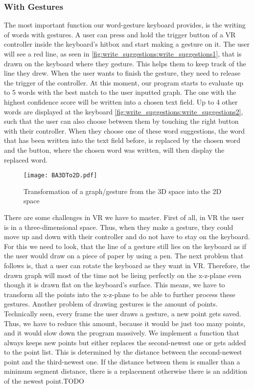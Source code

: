 \subsubsection{With Gestures}
The most important function our word-gesture keyboard provides, is the writing of words with gestures. A user can press and hold the trigger button of a VR controller inside the keyboard's hitbox and start making a gesture on it. The user will see a red line, as seen in \cref{fig:write_suggestions:write_suggestions1}, that is drawn on the keyboard where they gesture. This helps them to keep track of the line they drew. When the user wants to finish the gesture, they need to release the trigger of the controller. At this moment, our program starts to evaluate up to 5 words with the best match to the user inputted graph. The one with the highest confidence score will be written into a chosen text field. Up to 4 other words are displayed at the keyboard \cref{fig:write_suggestions:write_suggestions2}, such that the user can also choose between them by touching the right button with their controller. When they choose one of these word suggestions, the word that has been written into the text field before, is replaced by the chosen word and the button, where the chosen word was written, will then display the replaced word.\\
\begin{figure}[H]
    \centering
    \texttt{[image: BA3DTo2D.pdf]}
    \caption{Transformation of a graph/gesture from the 3D space into the 2D space}
    \label{fig:3DTo2D}
    \end{figure}
There are some challenges in VR we have to master. First of all, in VR the user is in a three-dimensional space. Thus, when they make a gesture, they could move up and down with their controller and do not have to stay on the keyboard. For this we need to look, that the line of a gesture still lies on the keyboard as if the user would draw on a piece of paper by using a pen. The next problem that follows is, that a user can rotate the keyboard as they want in VR. Therefore, the drawn graph will most of the time not be lieing perfectly on the x-z-plane even though it is drawn flat on the keyboard's surface. This means, we have to transform all the points into the x-z-plane to be able to further process these gestures. Another problem of drawing gestures is the amount of points. Technically seen, every frame the user draws a gesture, a new point gets saved. Thus, we have to reduce this amount, because it would be just too many points, and it would slow down the program massively. We implement a function that always keeps new points but either replaces the second-newest one or gets added to the point list. This is determined by the distance between the second-newest point and the third-newest one. If the distance between them is smaller than a minimum segment distance, there is a replacement otherwise there is an addition of the newest point.TODO

